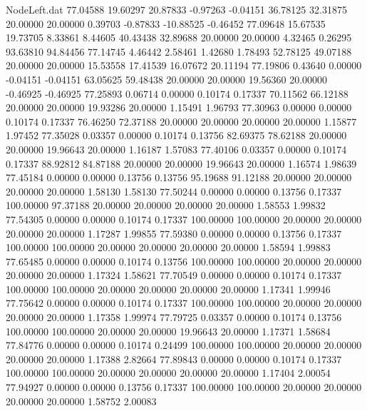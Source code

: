 \begin{filecontents}{NodeLeft.dat}
  77.04588   19.60297   20.87833    -0.97263   -0.04151   36.78125   32.31875   20.00000   20.00000    0.39703   -0.87833  -10.88525   -0.46452
  77.09648   15.67535   19.73705     8.33861    8.44605   40.43438   32.89688   20.00000   20.00000    4.32465    0.26295   93.63810   94.84456
  77.14745    4.46442    2.58461     1.42680    1.78493   52.78125   49.07188   20.00000   20.00000   15.53558   17.41539   16.07672   20.11194
  77.19806    0.43640    0.00000    -0.04151   -0.04151   63.05625   59.48438   20.00000   20.00000   19.56360   20.00000   -0.46925   -0.46925
  77.25893    0.06714    0.00000     0.10174    0.17337   70.11562   66.12188   20.00000   20.00000   19.93286   20.00000    1.15491    1.96793
  77.30963    0.00000    0.00000     0.10174    0.17337   76.46250   72.37188   20.00000   20.00000   20.00000   20.00000    1.15877    1.97452
  77.35028    0.03357    0.00000     0.10174    0.13756   82.69375   78.62188   20.00000   20.00000   19.96643   20.00000    1.16187    1.57083
  77.40106    0.03357    0.00000     0.10174    0.17337   88.92812   84.87188   20.00000   20.00000   19.96643   20.00000    1.16574    1.98639
  77.45184    0.00000    0.00000     0.13756    0.13756   95.19688   91.12188   20.00000   20.00000   20.00000   20.00000    1.58130    1.58130
  77.50244    0.00000    0.00000     0.13756    0.17337  100.00000   97.37188   20.00000   20.00000   20.00000   20.00000    1.58553    1.99832
  77.54305    0.00000    0.00000     0.10174    0.17337  100.00000  100.00000   20.00000   20.00000   20.00000   20.00000    1.17287    1.99855
  77.59380    0.00000    0.00000     0.13756    0.17337  100.00000  100.00000   20.00000   20.00000   20.00000   20.00000    1.58594    1.99883
  77.65485    0.00000    0.00000     0.10174    0.13756  100.00000  100.00000   20.00000   20.00000   20.00000   20.00000    1.17324    1.58621
  77.70549    0.00000    0.00000     0.10174    0.17337  100.00000  100.00000   20.00000   20.00000   20.00000   20.00000    1.17341    1.99946
  77.75642    0.00000    0.00000     0.10174    0.17337  100.00000  100.00000   20.00000   20.00000   20.00000   20.00000    1.17358    1.99974
  77.79725    0.03357    0.00000     0.10174    0.13756  100.00000  100.00000   20.00000   20.00000   19.96643   20.00000    1.17371    1.58684
  77.84776    0.00000    0.00000     0.10174    0.24499  100.00000  100.00000   20.00000   20.00000   20.00000   20.00000    1.17388    2.82664
  77.89843    0.00000    0.00000     0.10174    0.17337  100.00000  100.00000   20.00000   20.00000   20.00000   20.00000    1.17404    2.00054
  77.94927    0.00000    0.00000     0.13756    0.17337  100.00000  100.00000   20.00000   20.00000   20.00000   20.00000    1.58752    2.00083

\end{filecontents}
